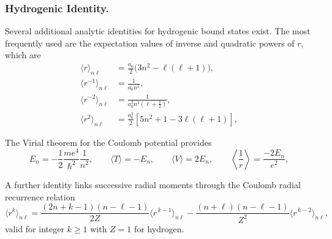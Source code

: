 \documentclass[../../../main.tex]{subfiles}
\begin{document}
  \subsubsection{Hydrogenic Identity.}
  Several additional analytic identities for hydrogenic bound states exist.
  The most frequently used are the expectation values of inverse and quadratic powers of $r$, which are
  \begin{align*}
    \langle r\rangle_{n\ell}
     & = \frac{a_{0}}{2}\bigl(3n^{2}-\ell(\ell+1)\bigr),         \\
    \langle r^{-1}\rangle_{n\ell}
     & = \frac{1}{a_{0}n^{2}},                                   \\
    \langle r^{-2}\rangle_{n\ell}
     & = \frac{1}{a_{0}^{2}n^{3}\left(\ell+\tfrac12\right)},     \\
    \langle r^{2}\rangle_{n\ell}
     & = \frac{a_{0}^{2}}{2}\left[5n^{2}+1-3\ell(\ell+1)\right],
  \end{align*}

  The Virial theorem for the Coulomb potential provides
  \begin{equation*}
    E_{n}
    =-\frac{1}{2}\frac{me^{4}}{\hbar^{2}}\frac{1}{n^{2}},
    \qquad
    \langle T\rangle=-E_{n},
    \qquad
    \langle V\rangle=2E_{n},
    \qquad
    \left\langle \frac{1}{r}\right\rangle=\frac{-2E_{n}}{e^{2}},
  \end{equation*}

  A further identity links successive radial moments through the Coulomb radial recurrence relation
  \begin{equation*}
    \langle r^{k}\rangle_{n\ell}
    =\frac{(2n+k-1)(n-\ell-1)}{2Z}\langle r^{\,k-1}\rangle_{n\ell}
    -\frac{(n+\ell)(n-\ell-1)}{Z^{2}}\langle r^{\,k-2}\rangle_{n\ell},
  \end{equation*}
  valid for integer $k\geq 1$ with $Z=1$ for hydrogen.
\end{document}
